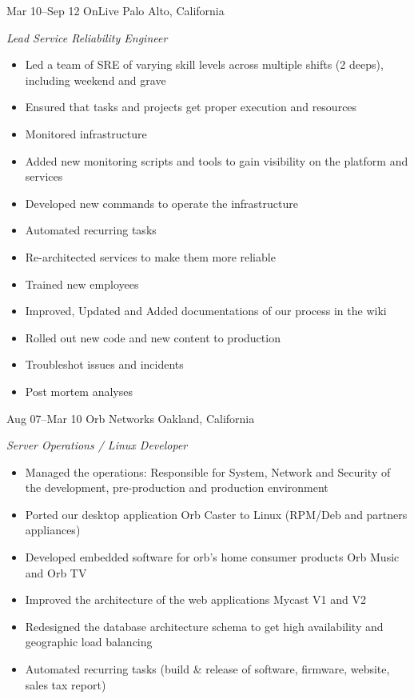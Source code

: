 \documentclass[]{friggeri-cv} %
\begin{document}
\begin{entrylist}
\entry
{Mar 10--Sep 12}
{OnLive}
{Palo Alto, California}
{\emph{Lead Service Reliability Engineer} \\
\begin{itemize}
\item Led a team of SRE of varying skill levels across multiple shifts (2 deeps), including weekend and grave
\item Ensured that tasks and projects get proper execution and resources
\item Monitored infrastructure
\item Added new monitoring scripts and tools to gain visibility on the platform and services
\item Developed new commands to operate the infrastructure 
\item Automated recurring tasks
\item Re-architected services to make them more reliable 
\item Trained new employees
\item Improved, Updated and Added documentations of our process in the wiki
\item Rolled out new code and new content to production 
\item Troubleshot issues and incidents
\item Post mortem analyses
\end{itemize}}
\entry
{Aug 07--Mar 10}
{Orb Networks}
{Oakland, California}
{\emph{Server Operations / Linux Developer} \\
\begin{itemize}
\item Managed the operations: Responsible for System, Network and Security of the development, pre-production and production environment
\item Ported our desktop application Orb Caster to Linux (RPM/Deb and partners appliances)
\item Developed embedded software for orb’s home consumer products Orb Music and Orb TV
\item Improved the architecture of the web applications Mycast V1 and V2
\item Redesigned the database architecture schema to get high availability and geographic load balancing
\item Automated recurring tasks (build \& release of software, firmware, website, sales tax report)

\end{itemize}}
\end{entrylist}
\end{document}
